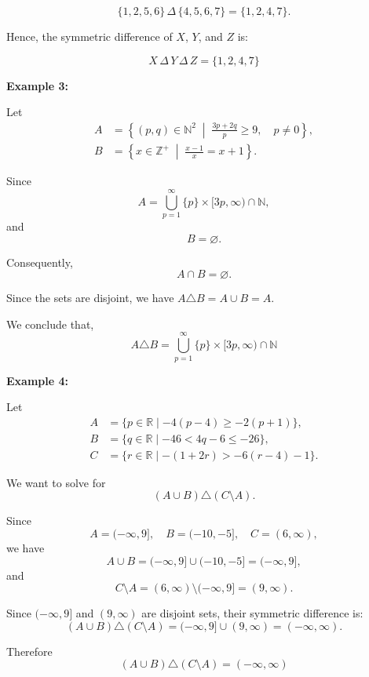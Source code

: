 \documentclass[12pt,a4paper,openany]{article}
\begin{document}
\[
\{1, 2, 5, 6\} \,\Delta\, \{4, 5, 6, 7\} = \{1, 2, 4, 7\}.
\]

Hence, the symmetric difference of $X$, $Y$, and $Z$ is:

\[
\boxed{X \,\Delta\, Y \,\Delta\, Z = \{1, 2, 4, 7\}}
\]

\textbf{Example 3:}

Let
\[
\begin{aligned}
A &= \left\{ (p,q) \in \mathbb{N}^2 \;\middle|\; \frac{3p+2q}{p} \ge 9, \quad p \neq 0 \right\}, \\
B &= \left\{ x \in \mathbb{Z}^+ \;\middle|\; \frac{x-1}{x} = x+1 \right\}.
\end{aligned}
\]

Since
\[
A = \displaystyle\bigcup_{p=1}^{\infty} \{p\} \times [3p,\infty) \cap \mathbb{N},
\]
and
\[
B = \varnothing.
\]

Consequently,
\[
A \cap B = \varnothing.
\]

Since the sets are disjoint, we have \( A \triangle B = A \cup B = A \).

We conclude that,
\[
\boxed{
A \triangle B = \bigcup_{p=1}^{\infty} \{p\} \times [3p,\infty) \cap \mathbb{N}
}
\]

\vspace{1em}

\textbf{Example 4:}

Let 
\[
\begin{aligned}
A &= \{p \in \mathbb{R} \mid -4(p-4) \ge -2(p+1)\},\\
B &= \{q \in \mathbb{R} \mid -46 < 4q - 6 \le -26\},\\
C &= \{r \in \mathbb{R} \mid -(1 + 2r) > -6(r-4) - 1\}.
\end{aligned}
\]

We want to solve for
\[
(A \cup B) \triangle (C \setminus A).
\]

Since  
\[
A = (-\infty, 9], \quad B = (-10, -5], \quad C = (6, \infty),
\]
we have
\[
A \cup B = (-\infty, 9] \cup (-10, -5] = (-\infty, 9],
\]
and
\[
C \setminus A = (6, \infty) \setminus (-\infty, 9] = (9, \infty).
\]

Since $(-\infty, 9]$ and $(9, \infty)$ are disjoint sets, their symmetric difference is:
\[
(A \cup B) \triangle (C \setminus A) = (-\infty, 9] \cup (9, \infty) = (-\infty, \infty).
\]

Therefore
\[
\boxed{(A \cup B) \triangle (C \setminus A) = (-\infty, \infty)}
\]

\vspace{1em}
\end{document}
